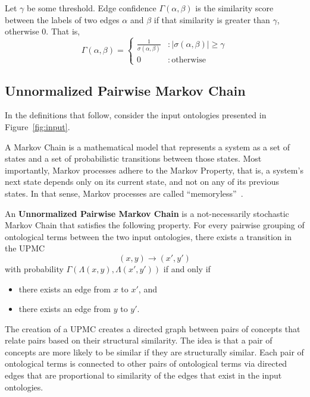 \documentclass[letterpaper,twocolumn,12pt]{article}
\begin{document}
\begin{defn}
\label{edgeconfidence}
Let $\gamma$ be some threshold. Edge confidence $\Gamma \left( \alpha, \beta \right)$ is the similarity score between the labels of two edges $\alpha$ and $\beta$ if that similarity is greater than $\gamma$, otherwise $0$. That is,
$$ \Gamma \left( \alpha, \beta \right) = \left\{
   	 \begin{array}{ll}
           \frac{1}{\sigma \left( \alpha, \beta \right)} & : \vert \sigma \left( \alpha, \beta \right) \vert \geq \gamma \\
           0                                             & : \mathrm{otherwise}
     \end{array}
   \right.$$
\end{defn}

\subsection{Unnormalized Pairwise Markov Chain}
In the definitions that follow, consider the input ontologies presented in Figure~\ref{fig:input}.

A Markov Chain is a mathematical model that represents a system as a set of states and a set of probabilistic transitions between those states. 
Most importantly, Markov processes adhere to the Markov Property, that is, a system's next state depends only on its current state, and not on any of its previous states. 
In that sense, Markov processes are called ``memoryless''~\cite{bcnn:2010:simulation}.

\begin{defn}
An {\bf Unnormalized Pairwise Markov Chain} is a not-necessarily stochastic Markov Chain that satisfies the following property.
For every pairwise grouping of ontological terms between the two input ontologies, there exists a transition in the UPMC
$$ (x, y) \rightarrow (x', y') $$
with probability $\Gamma(\Lambda(x, y), \Lambda(x', y'))$ if and only if
\begin{itemize}
\item there exists an edge from $x$ to $x'$, and
\item there exists an edge from $y$ to $y'$.
\end{itemize}
\end{defn}

The creation of a UPMC creates a directed graph between pairs of concepts that relate pairs based on their structural similarity.
The idea is that a pair of concepts are more likely to be similar if they are structurally similar.
Each pair of ontological terms is connected to other pairs of ontological terms via directed edges that are proportional to similarity of the edges that exist in the input ontologies. 
\end{document}
